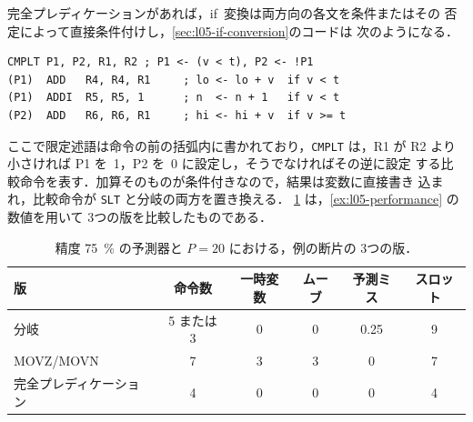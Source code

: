\documentclass[../main.tex]{subfiles}
\begin{document}
\begin{example}
  \label{ex:l05-full}
  完全プレディケーションがあれば，if~変換は両方向の各文を条件またはその
  否定によって直接条件付けし，\cref{sec:l05-if-conversion}のコードは
  次のようになる．
  \begin{lstlisting}[language={[x86masm]Assembler}, numbers=none]
      CMPLT P1, P2, R1, R2 ; P1 <- (v < t), P2 <- !P1
(P1)  ADD   R4, R4, R1     ; lo <- lo + v  if v < t
(P1)  ADDI  R5, R5, 1      ; n  <- n + 1   if v < t
(P2)  ADD   R6, R6, R1     ; hi <- hi + v  if v >= t
\end{lstlisting}
  ここで限定述語は命令の前の括弧内に書かれており，\texttt{CMPLT} は，R1 が
  R2 より小さければ P1 を~1，P2 を~0 に設定し，そうでなければその逆に設定
  する比較命令を表す．加算そのものが条件付きなので，結果は変数に直接書き
  込まれ，比較命令が \texttt{SLT} と分岐の両方を置き換える．
  \cref{tab:l05-versions} は，\cref{ex:l05-performance} の数値を用いて
  3つの版を比較したものである．
\end{example}

\begin{table}[htbp]
  \centering\small
  \caption{精度 \SI{75}{\percent} の予測器と $P = 20$ における，例の断片の
    3つの版．}
  \label{tab:l05-versions}
  \begin{tabular}{@{}lccccc@{}}
    \toprule
    版 & 命令数 & 一時変数 & ムーブ & 予測ミス & スロット \\
    \midrule
    分岐                   & 5 または 3 & 0 & 0 & 0.25 & 9 \\
    MOVZ/MOVN              & 7          & 3 & 3 & 0    & 7 \\
    完全プレディケーション & 4          & 0 & 0 & 0    & 4 \\
    \bottomrule
  \end{tabular}
\end{table}
\end{document}
